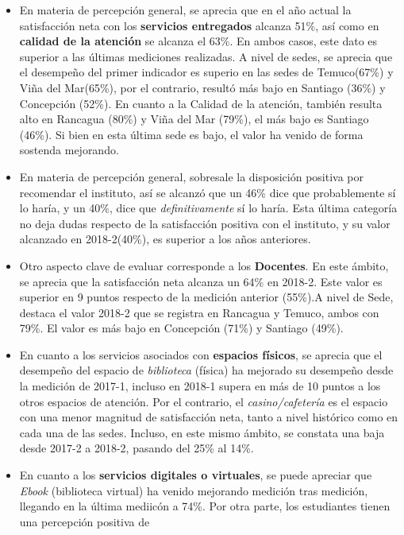 \documentclass[]{book}
\begin{document}
\begin{itemize}
\item
  En materia de percepción general, se aprecia que en el año actual la
  satisfacción neta con los \textbf{servicios entregados} alcanza 51\%,
  así como en \textbf{calidad de la atención} se alcanza el 63\%. En
  ambos casos, este dato es superior a las últimas mediciones
  realizadas. A nivel de sedes, se aprecia que el desempeño del primer
  indicador es superio en las sedes de Temuco(67\%) y Viña del
  Mar(65\%), por el contrario, resultó más bajo en Santiago (36\%) y
  Concepción (52\%). En cuanto a la Calidad de la atención, también
  resulta alto en Rancagua (80\%) y Viña del Mar (79\%), el más bajo es
  Santiago (46\%). Si bien en esta última sede es bajo, el valor ha
  venido de forma sostenda mejorando.
\item
  En materia de percepción general, sobresale la disposición positiva
  por recomendar el instituto, así se alcanzó que un 46\% dice que
  probablemente sí lo haría, y un 40\%, dice que \emph{definitivamente}
  sí lo haría. Esta última categoría no deja dudas respecto de la
  satisfacción positiva con el instituto, y su valor alcanzado en
  2018-2(40\%), es superior a los años anteriores.
\item
  Otro aspecto clave de evaluar corresponde a los \textbf{Docentes}. En
  este ámbito, se aprecia que la satisfacción neta alcanza un 64\% en
  2018-2. Este valor es superior en 9 puntos respecto de la medición
  anterior (55\%).A nivel de Sede, destaca el valor 2018-2 que se
  registra en Rancagua y Temuco, ambos con 79\%. El valor es más bajo en
  Concepción (71\%) y Santiago (49\%).
\item
  En cuanto a los servicios asociados con \textbf{espacios físicos}, se
  aprecia que el desempeño del espacio de \emph{biblioteca} (física) ha
  mejorado su desempeño desde la medición de 2017-1, incluso en 2018-1
  supera en más de 10 puntos a los otros espacios de atención. Por el
  contrario, el \emph{casino/cafetería} es el espacio con una menor
  magnitud de satisfacción neta, tanto a nivel histórico como en cada
  una de las sedes. Incluso, en este mismo ámbito, se constata una baja
  desde 2017-2 a 2018-2, pasando del 25\% al 14\%.
\item
  En cuanto a los \textbf{servicios digitales o virtuales}, se puede
  apreciar que \emph{Ebook} (biblioteca virtual) ha venido mejorando
  medición tras medición, llegando en la última mediicón a 74\%. Por
  otra parte, los estudiantes tienen una percepción positiva de

\end{itemize}
\end{document}
